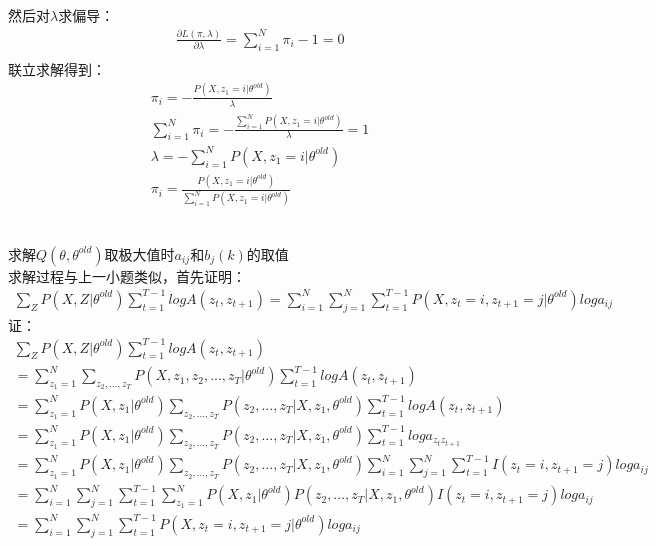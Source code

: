 \documentclass[12pt,a4paper]{article}
\begin{document}
然后对$\lambda$求偏导：
\begin{gather*}
    \frac{\partial L(\pi,\lambda)}{\partial \lambda} = \sum_{i=1}^{N}\pi_i - 1 = 0\\
\end{gather*}
联立求解得到：
\begin{gather*}
    \pi_i = -\frac{P(X,z_1 = i|\theta^{old})}{\lambda}\\
    \sum_{i=1}^{N}\pi_i = -\frac{\sum_{i=1}^{N}P(X,z_1 = i|\theta^{old})}{\lambda} = 1\\
    \lambda = -\sum_{i=1}^{N}P(X,z_1 = i|\theta^{old})\\
    \pi_i = \frac{P(X,z_1 = i|\theta^{old})}{\sum_{i=1}^{N}P(X,z_1 = i|\theta^{old})}\\
\end{gather*}
\subsection{}
求解$Q(\theta,\theta^{old})$取极大值时$a_{ij}$和$b_{j}(k)$的取值\\
求解过程与上一小题类似，首先证明：
\begin{gather}
    \sum_{Z}P(X,Z|\theta^{old})\sum_{t=1}^{T-1}logA(z_t,z_{t+1}) = \sum_{i=1}^{N}\sum_{j=1}^{N}\sum_{t=1}^{T-1}P(X,z_t = i,z_{t+1} = j|\theta^{old})loga_{ij}
\end{gather}
证：
\begin{gather*}
    \sum_{Z}P(X,Z|\theta^{old})\sum_{t=1}^{T-1}logA(z_t,z_{t+1})\\
    = \sum_{z_1=1}^{N}\sum_{z_2,...,z_T}P(X,z_1,z_2,...,z_T|\theta^{old})\sum_{t=1}^{T-1}logA(z_t,z_{t+1})\\
    =\sum_{z_1=1}^{N}P(X,z_1|\theta^{old})\sum_{z_2,...,z_T}P(z_2,...,z_T|X,z_1,\theta^{old})\sum_{t=1}^{T-1}logA(z_t,z_{t+1})\\
    = \sum_{z_1=1}^{N}P(X,z_1|\theta^{old})\sum_{z_2,...,z_T}P(z_2,...,z_T|X,z_1,\theta^{old})\sum_{t=1}^{T-1}loga_{z_tz_{t+1}}\\
    = \sum_{z_1=1}^{N}P(X,z_1|\theta^{old})\sum_{z_2,...,z_T}P(z_2,...,z_T|X,z_1,\theta^{old})\sum_{i=1}^{N}\sum_{j=1}^{N}\sum_{t=1}^{T-1}I(z_t = i,z_{t+1} = j)loga_{ij}\\
    = \sum_{i=1}^{N}\sum_{j=1}^{N}\sum_{t=1}^{T-1}\sum_{z_1=1}^{N}P(X,z_1|\theta^{old})P(z_2,...,z_T|X,z_1,\theta^{old})I(z_t = i,z_{t+1} = j)loga_{ij}\\
    = \sum_{i=1}^{N}\sum_{j=1}^{N}\sum_{t=1}^{T-1}P(X,z_t = i,z_{t
    +1} = j|\theta^{old})loga_{ij}\\
\end{gather*}
\end{document}
